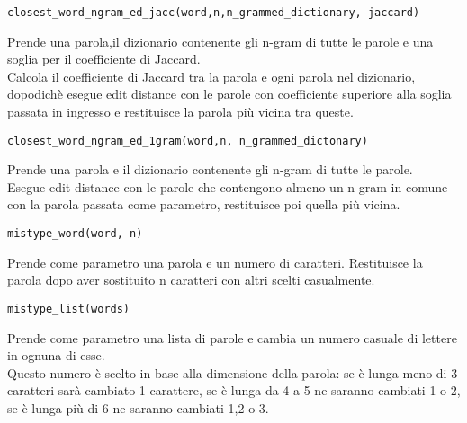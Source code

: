\documentclass[]{article}
\begin{document}
\begin{verbatim}
closest_word_ngram_ed_jacc(word,n,n_grammed_dictionary, jaccard)
\end{verbatim}
Prende una parola,il dizionario contenente gli n-gram di tutte le parole e una soglia per il coefficiente di Jaccard.\\
Calcola il coefficiente di Jaccard tra la parola e ogni parola nel dizionario, dopodichè esegue edit distance con le parole con coefficiente superiore alla soglia passata in ingresso e restituisce la parola più vicina tra queste.\\
\begin{verbatim}
closest_word_ngram_ed_1gram(word,n, n_grammed_dictonary)
\end{verbatim}
Prende una parola e il dizionario contenente gli n-gram di tutte le parole.\\
Esegue edit distance con le parole che contengono almeno un n-gram in comune con la parola passata come parametro, restituisce poi quella più vicina.

\begin{verbatim}
mistype_word(word, n)
\end{verbatim}
Prende come parametro una parola e un numero di caratteri. Restituisce la parola dopo aver sostituito n caratteri con altri scelti casualmente.

\begin{verbatim}
mistype_list(words)
\end{verbatim}
Prende come parametro una lista di parole e cambia un numero casuale di lettere in ognuna di esse.\\ Questo numero è scelto in base alla dimensione della parola: se è lunga meno di 3 caratteri sarà cambiato 1 carattere, se è lunga da 4 a 5 ne saranno cambiati 1 o 2, se è lunga più di 6 ne saranno cambiati 1,2 o 3.\\
\newpage
\end{document}
